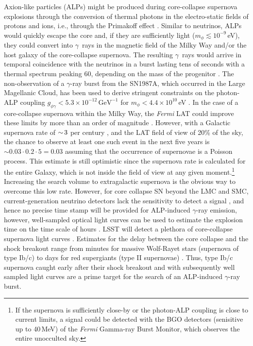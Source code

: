 Axion-like particles (ALPs) might be produced during core-collapse supernova explosions through the conversion of thermal photons in the electro-static fields of protons and ions, i.e., through the Primakoff effect \citep{1996slfp.book.....R}.  
Similar to neutrinos, ALPs would quickly escape the core and, if they are sufficiently light ($m_\phi \lesssim 10^{-9}\,$eV), they could convert into $\gamma$~rays in the magnetic field of the Milky Way and/or the host galaxy of the core-collapse supernova. 
The resulting $\gamma$~rays would arrive in temporal coincidence with the neutrinos in a burst lasting tens of seconds with a 
thermal spectrum peaking 60\MeV, depending on the mass of the progenitor \citep{2015JCAP...02..006P}.
The non-observation of a $\gamma$-ray burst from the SN1987A, which occurred in the Large Magellanic Cloud, has been used to derive stringent constraints on the photon-ALP coupling $g_{\phi\gamma}<5.3\times10^{-12}\,\mathrm{GeV}^{-1}$ for $m_\phi < 4.4\times10^{10} $\,eV \citep{1996PhLB..383..439B, 1996PhRvL..77.2372G,2015JCAP...02..006P}.
In the case of a core-collapse supernova within the Milky Way, the \textit{Fermi} LAT could improve these limits by more than an order of magnitude \citep{2017PhRvL.118a1103M}. 
However, with a Galactic supernova rate of $ {\sim}\, 3$ per century \citep[e.g.,][]{2013ApJ...778..164A}, and the LAT field of view of 20\% of the sky, the chance to observe at least one such event in the next five years is $\sim 0.03 \cdot 0.2 \cdot 5 = 0.03$ assuming that the occurrence of supernovae is a Poisson process. This estimate is still optimistic since the supernova rate is calculated for the entire Galaxy, which is not inside the field of view at any given moment.\footnote{If the supernova is sufficiently close-by or the photon-ALP coupling is close to current limits, a signal could be detected with the BGO detectors (senisitive up to 40\,MeV) of the \emph{Fermi} Gamma-ray Burst Monitor, which observes the entire unocculted sky.}
Increasing the search volume to extragalactic supernova is the obvious way to overcome this low rate. 
However, for core collapse SN beyond the LMC and SMC, current-generation neutrino detectors lack the sensitivity to detect a signal \citep[e.g.,][]{2011PhRvD..83l3008K}, and hence no precise time stamp will be provided for ALP-induced $\gamma$-ray emission, however, well-sampled optical light curves can be used to estimate the explosion time on the time scale of hours \citep{2010APh....33...19C}. 
LSST will detect a plethora of core-collapse supernova light curves \citep{Lien:2009}. 
Estimates for the delay between the core collapse and the shock breakout range from minutes for massive Wolf-Rayet stars (supernova of type Ib/c) to days for red supergiants (type II supernovae) \citep{2013ApJ...778...81K}. 
Thus, type Ib/c supernova caught early after their shock breakout and with subsequently well sampled light curves are a prime target for the search of an ALP-induced $\gamma$-ray burst. 

